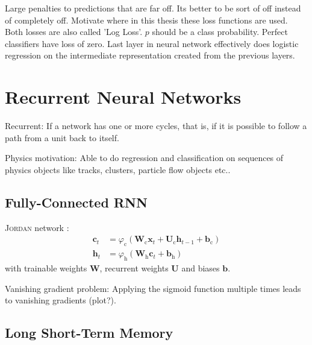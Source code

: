 \cite{esl}

Large penalties to predictions
that are far off. Its better to be sort of off instead of completely off.
Motivate where in this thesis these loss functions are used. Both losses are
also called 'Log Loss'. $p$ should be a class probability. Perfect classifiers
have loss of zero. Last layer in neural network effectively does logistic
regression on the intermediate representation created from the previous layers.

\section{Recurrent Neural Networks}
\label{sec:rnn}

Recurrent: If a network has one or more cycles, that is, if it is possible to
follow a path from a unit back to itself.

Physics motivation: Able to do regression and classification on sequences of
physics objects like tracks, clusters, particle flow objects etc..

\subsection{Fully-Connected RNN}
\label{sec:fully_connected_rnn}

\textsc{Jordan} network :
\begin{align*}
  \mathbf{c}_t &= \varphi_{\text{c}}\left( \mathbf{W}_{\text{c}} \mathbf{x}_{t} + \mathbf{U}_{\text{c}} \mathbf{h}_{t-1} + \mathbf{b}_{\text{c}} \right) \\
  \mathbf{h}_t &= \varphi_{\text{h}}\left( \mathbf{W}_{\text{h}} \mathbf{c}_{t} + \mathbf{b}_{\text{h}} \right)
\end{align*}
with trainable weights $\mathbf{W}$, recurrent weights $\mathbf{U}$ and biases $\mathbf{b}$.

Vanishing gradient problem: Applying the sigmoid function multiple times leads
to vanishing gradients (plot?).

\subsection{Long Short-Term Memory}
\label{sec:lstm}

